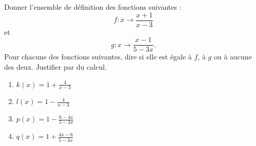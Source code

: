 
\begin{exercice}\label{exosmath-0294}

    Donner l'ensemble de définition des fonctions suivantes :
    \begin{equation}
        f\colon x\to \frac{ x+1 }{ x-3 }
    \end{equation}
    et
    \begin{equation}
        g\colon x\to \frac{ x-1 }{ 5-3x }.
    \end{equation}
    Pour chacune des fonctions suivantes, dire si elle est égale à \( f\), à \( g\) ou à aucune des deux. Justifier par du calcul.
    \begin{multicols}{2}
        \begin{enumerate}
            \item
                \( k(x)=1+\frac{ 4 }{ x-3 }\) 
            \item
                \( l(x)=1-\frac{ 4 }{ x-3 }\)
            \item
                \( p(x)=1-\frac{ 6-4x }{ 5-3x }\)
            \item
                \( q(x)=1+\frac{ 4x-6 }{ 5-3x }\)
        \end{enumerate}
    \end{multicols}

\end{exercice}
